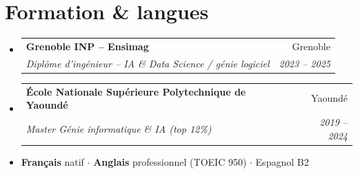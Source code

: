 \documentclass[a4paper,10.5pt]{article}
\makeatletter
\newcommand{\resumeSubheading}[4]{\vspace{4pt}\item\begin{tabular*}{0.97\textwidth}[t]{l@{\extracolsep{\fill}}r}\textbf{#1}&{#2}\\\textit{\small #3}&\textit{\small #4}\\\end{tabular*}\vspace{2pt}}
\newcommand{\resumeSubHeadingListStart}{\begin{itemize}[leftmargin=0.08in,label={}]}
\newcommand{\resumeSubHeadingListEnd}{\end{itemize}}
\makeatother
\begin{document}
\section{Formation \& langues}
\resumeSubHeadingListStart
  \resumeSubheading{Grenoble INP -- Ensimag}{Grenoble}{Dipl\^ome d'ing\'enieur -- IA \& Data Science / g\'enie logiciel}{2023 -- 2025}
  \resumeSubheading{\'Ecole Nationale Sup\'erieure Polytechnique de Yaound\'e}{Yaound\'e}{Master G\'enie informatique \& IA (top 12\%)}{2019 -- 2024}
\resumeSubHeadingListEnd
\begin{itemize}[leftmargin=0.08in,label={}]\item \textbf{Fran\c{c}ais} natif $\cdot$ \textbf{Anglais} professionnel (TOEIC 950) $\cdot$ Espagnol B2\end{itemize}
\end{document}
